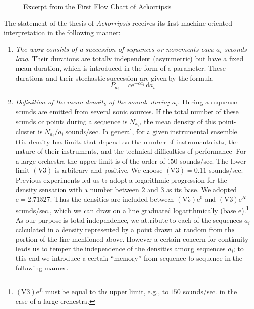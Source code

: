 \documentclass[letterpaper, 11pt]{article}
\begin{document}
\begin{figure}[htbp]
    \centering
    \resizebox{.95\linewidth}{!}{}
    \caption{Excerpt from the First Flow Chart of Achorripsis}
    \label{fig:flow-chart}
\end{figure}

The statement of the thesis of \textit{Achorripsis} receives its first machine-oriented interpretation in the following manner:

\begin{enumerate}
    \item 
        \textit{The work consists of a succession of sequences or movements each \(a_i\) seconds long}.
        Their durations are totally independent (asymmetric) but have a fixed mean duration, which is introduced in the form of a parameter.
        These durations and their stochastic succession are given by the formula
        \[P_{a_i} = c \mathrm{e}^{-ca_i} \, \mathrm{d}a_i \tag{See Appendix I.}\]
    \item
        \textit{Definition of the mean density of the sounds during \(a_i\)}.
        During a sequence sounds are emitted from several sonic sources.
        If the total number of these sounds or points during a sequence is \(N_{a_i}\), the mean density of this point-cluster is \(N_{a_i} / a_i\) sounds/sec.
        In general, for a given instrumental ensemble this density has limits that depend on the number of instrumentalists, the nature of their instruments, and the technical difficulties of performance.
        For a large orchestra the upper limit is of the order of \(150\) sounds/sec.
        The lower limit \((\mathrm{V}3)\) is arbitrary and positive.
        We choose \((\mathrm{V}3) = 0.11\) sounds/sec.
        Previous experiments led us to adopt a logarithmic progression for the density sensation with a number between \(2\) and \(3\) as its base.
        We adopted \(\mathrm{e} = 2.71827\).
        Thus the densities are included between \((\mathrm{V}3)\mathrm{e}^0\) and \((\mathrm{V}3)\mathrm{e}^R\) sounds/sec., which we can draw on a line graduated logarithmically (base \(\mathrm{e}\)).\footnote{\((\mathrm{V}3)\mathrm{e}^R\) must be equal to the upper limit, e.g., to \(150\) sounds/sec. in the case of a large orchestra.}
        As our purpose is total independence, we attribute to each of the sequences \(a_i\) calculated in  a density represented by a point drawn at random from the portion of the line mentioned above.
        However a certain concern for continuity leads us to temper the independence of the densities among sequences \(a_i\); to this end we introduce a certain ``memory'' from sequence to sequence in the following manner:


\end{enumerate}
\end{document}
